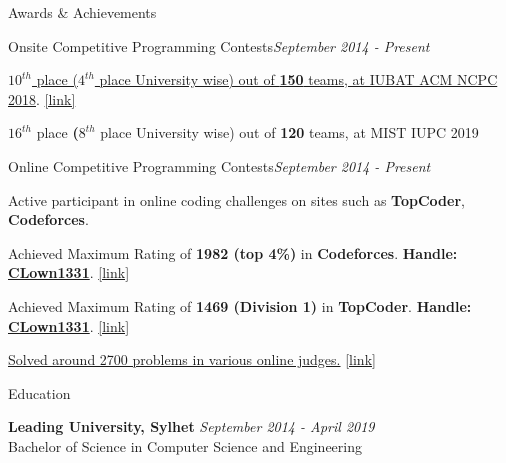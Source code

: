 \documentclass{resume}
\begin{document}
\begin{rSection}{Awards \& Achievements} 

\begin{rSubsection}{Onsite Competitive Programming Contests}{\em September 2014 - Present}{}{}{}
\item \href{https://icpc.baylor.edu/ICPCID/DII3NHEO8O8I}{\textbf{$10^{th}$} place (\textbf{$4^{th}$} place University wise) out of \textbf{150} teams, at IUBAT ACM NCPC 2018}. \href{https://icpc.baylor.edu/ICPCID/DII3NHEO8O8I}{[link]}
\item \textbf{$16^{th}$} place \textbf(\textbf{$8^{th}$} place University wise) out of \textbf{120} teams, at MIST IUPC 2019
\end{rSubsection}

\begin{rSubsection}{Online Competitive Programming Contests}{\em September 2014 - Present}{}{}{}
\item Active participant in online coding challenges on sites such as \textbf{TopCoder}, \textbf{Codeforces}.
\item Achieved Maximum Rating of \textbf{1982 (top 4\%)} in \textbf{Codeforces}. \textbf{Handle:} \textbf{\href{http://codeforces.com/profile/CLown1331}{CLown1331}}. \href{http://codeforces.com/profile/CLown1331}{[link]}
\item Achieved Maximum Rating of \textbf{1469 (Division 1)} in \textbf{TopCoder}. \textbf{Handle:} \textbf{\href{https://www.topcoder.com/members/CLown1331/}{CLown1331}}. \href{https://www.topcoder.com/members/CLown1331/}{[link]}
\item \href{https://www.stopstalk.com/user/profile/clown1331}{Solved around 2700 problems in various online judges.} \href{https://www.stopstalk.com/user/profile/clown1331}{[link]}
\end{rSubsection}

\end{rSection}


\begin{rSection}{Education}

{\bf Leading University, Sylhet} \hfill {\em September 2014 - April 2019}
\\ Bachelor of Science in Computer Science and Engineering
\end{rSection}
\end{document}
